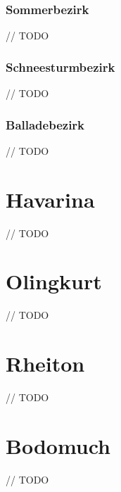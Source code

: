 \documentclass[a4paper,11pt]{report}
\begin{document}
\subsubsection{Sommerbezirk}
// TODO

\subsubsection{Schneesturmbezirk}
// TODO

\subsubsection{Balladebezirk}
// TODO



\section{Havarina}
// TODO

\section{Olingkurt}
// TODO

\section{Rheiton}
// TODO

\section{Bodomuch}
// TODO
\end{document}
